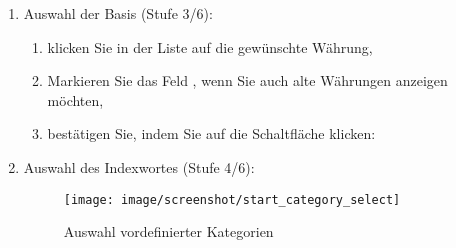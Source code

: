 \begin{enumerate}
	\item Auswahl der Basis (Stufe 3/6):%
		\begin{enumerate} 
		\item klicken Sie in der Liste auf die gewünschte Währung,%
		\item Markieren Sie das Feld , wenn Sie auch alte Währungen anzeigen möchten,%
		\item bestätigen Sie, indem Sie auf die Schaltfläche  klicken:%
		\end{enumerate}

	\item Auswahl des Indexwortes  (Stufe 4/6):%
	
\begin{figure}[htbp]
	\begin{center}
		\texttt{[image: image/screenshot/start\_category\_select]}
	\end{center}
	\caption{Auswahl vordefinierter Kategorien}%
\label{start_category_select}
\end{figure}


\end{enumerate}
